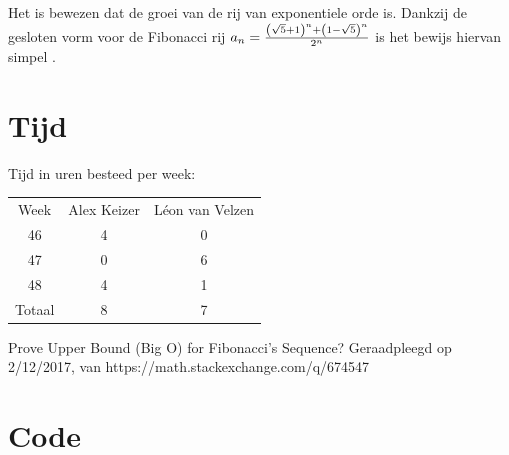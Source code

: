\documentclass[13pt]{article}
\begin{document}
Het is bewezen dat de groei van de rij van exponentiele orde is. Dankzij de gesloten vorm voor de Fibonacci rij $a_n={{\left(\sqrt{5}+1\right)^{n}+\left(1-\sqrt{5}\right)^{n}}\over{2^{n}}}$ is het bewijs hiervan simpel \cite{proof}.

\section{Tijd}

Tijd in uren besteed per week:

\begin{center}
\begin{tabular}{ |c|c|c| }
\hline
Week & Alex Keizer & L\'{e}on van Velzen \\
46 & 4 & 0 \\
47 & 0 & 6 \\
48 & 4 & 1 \\ 
\hline
Totaal & 8 & 7 \\
\hline
\end{tabular}
\end{center}

\begin{thebibliography}{9}
     Prove Upper Bound (Big O) for Fibonacci's Sequence? Geraadpleegd op 2/12/2017, van https://math.stackexchange.com/q/674547
\end{thebibliography}

\section{Code}




\end{document}
